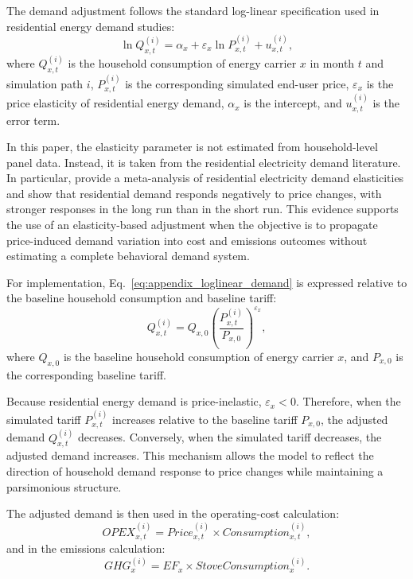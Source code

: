 \documentclass[authoryear,preprint,review,10pt]{elsarticle}
\begin{document}
The demand adjustment follows the standard log-linear specification used in residential energy demand studies:
\begin{equation}
\ln Q_{x,t}^{(i)} = \alpha_x + \varepsilon_x \ln P_{x,t}^{(i)} + u_{x,t}^{(i)},
\label{eq:appendix_loglinear_demand}
\end{equation}
where $Q_{x,t}^{(i)}$ is the household consumption of energy carrier $x$ in month $t$ and simulation path $i$, $P_{x,t}^{(i)}$ is the corresponding simulated end-user price, $\varepsilon_x$ is the price elasticity of residential energy demand, $\alpha_x$ is the intercept, and $u_{x,t}^{(i)}$ is the error term.

In this paper, the elasticity parameter is not estimated from household-level panel data. Instead, it is taken from the residential electricity demand literature. In particular, \citet{espey2004turning} provide a meta-analysis of residential electricity demand elasticities and show that residential demand responds negatively to price changes, with stronger responses in the long run than in the short run. This evidence supports the use of an elasticity-based adjustment when the objective is to propagate price-induced demand variation into cost and emissions outcomes without estimating a complete behavioral demand system.

For implementation, Eq.~\eqref{eq:appendix_loglinear_demand} is expressed relative to the baseline household consumption and baseline tariff:
\begin{equation}
Q_{x,t}^{(i)} =
Q_{x,0}
\left(
\frac{P_{x,t}^{(i)}}{P_{x,0}}
\right)^{\varepsilon_x},
\label{eq:elasticity_demand}
\end{equation}
where $Q_{x,0}$ is the baseline household consumption of energy carrier $x$, and $P_{x,0}$ is the corresponding baseline tariff.

Because residential energy demand is price-inelastic, $\varepsilon_x<0$. Therefore, when the simulated tariff $P_{x,t}^{(i)}$ increases relative to the baseline tariff $P_{x,0}$, the adjusted demand $Q_{x,t}^{(i)}$ decreases. Conversely, when the simulated tariff decreases, the adjusted demand increases. This mechanism allows the model to reflect the direction of household demand response to price changes while maintaining a parsimonious structure.

The adjusted demand is then used in the operating-cost calculation:
\begin{equation}
OPEX_{x,t}^{(i)} = Price_{x,t}^{(i)} \times Consumption_{x,t}^{(i)},
\end{equation}
and in the emissions calculation:
\begin{equation}
GHG_x^{(i)} =
EF_x \times StoveConsumption_x^{(i)}.
\end{equation}
\end{document}
